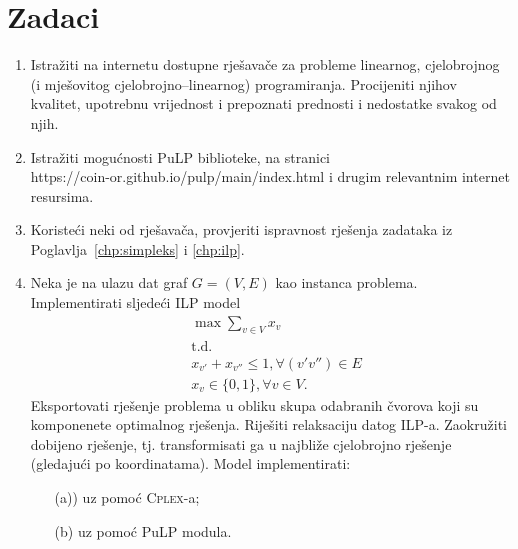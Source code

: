 \documentclass[b5paper, utf8, 11pt, colorlinks]{book}
\theoremstyle{definition}
\begin{document}
\section{Zadaci}
\begin{enumerate}
	\item Istražiti na internetu dostupne  rješavače za probleme linearnog, cjelobrojnog (i mješovitog cjelobrojno--linearnog) programiranja. Procijeniti njihov kvalitet, upotrebnu vrijednost i prepoznati   prednosti i nedostatke svakog od njih.
	\item Istražiti mogućnosti PuLP biblioteke, na stranici\\ https://coin-or.github.io/pulp/main/index.html i drugim relevantnim internet resursima.
	
	\item Koristeći neki od rješavača, provjeriti ispravnost rješenja zadataka iz Poglavlja~\ref{chp:simpleks} i \ref{chp:ilp}.
	
	\item Neka je na ulazu dat graf  $G = (V, E)$ kao instanca problema. Implementirati sljedeći ILP model
	\begin{align*}
		& \max \sum_{v \in V} x_v \\
		& \mbox{t.d.} \\
		& x_{v'} + x_{v''} \leq 1, \forall (v' v'')\in E \\
		& x_v \in \{0, 1 \}, \forall v \in  V.
	\end{align*}
Eksportovati rješenje problema u obliku skupa odabranih čvorova koji su komponenete optimalnog rješenja. Riješiti relaksaciju datog ILP-a. Zaokružiti dobijeno rješenje, tj. transformisati ga u najbliže cjelobrojno rješenje (gledajući po koordinatama).  Model implementirati:
\begin{enumerate}
	\item[(a))]  uz pomoć \textsc{Cplex}-a; 
	\item[(b)] uz pomoć PuLP modula.
\end{enumerate}


\end{enumerate}
\end{document}
